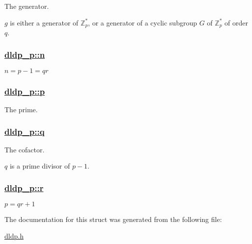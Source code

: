 The generator. 

$g$ is either a generator of $\mathds{Z}^{*}_p$, or a generator of a cyclic subgroup $G$ of $\mathds{Z}^{*}_p$ of order $q$. \hypertarget{structdldp__p_o4}{
\subsubsection[n]{\setlength{\rightskip}{0pt plus 5cm}\hyperlink{structdldp__p_o4}{dldp\_\-p::n}}}
\label{structdldp__p_o4}


$n=p-1=qr$ \hypertarget{structdldp__p_o0}{
\subsubsection[p]{\setlength{\rightskip}{0pt plus 5cm}\hyperlink{structdldp__p_o0}{dldp\_\-p::p}}}
\label{structdldp__p_o0}


The prime. 

\hypertarget{structdldp__p_o1}{
\subsubsection[q]{\setlength{\rightskip}{0pt plus 5cm}\hyperlink{structdldp__p_o1}{dldp\_\-p::q}}}
\label{structdldp__p_o1}


The cofactor. 

$q$ is a prime divisor of $p-1$. \hypertarget{structdldp__p_o2}{
\subsubsection[r]{\setlength{\rightskip}{0pt plus 5cm}\hyperlink{structdldp__p_o2}{dldp\_\-p::r}}}
\label{structdldp__p_o2}


$p=qr+1$ 

The documentation for this struct was generated from the following file:\begin{CompactItemize}
\item 
\hyperlink{dldp_8h}{dldp.h}\end{CompactItemize}
